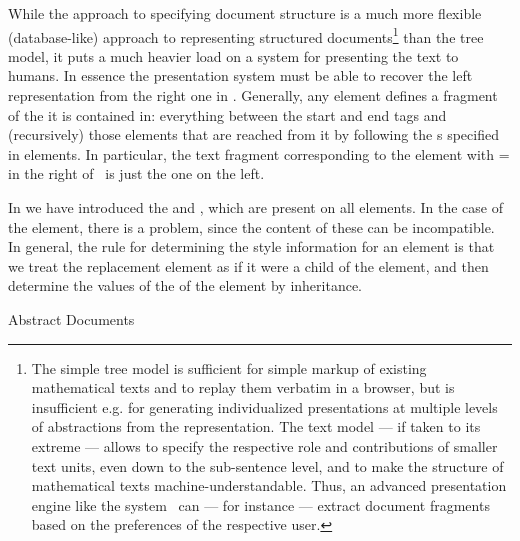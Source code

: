 \begin{omgroup}[id=omdoc-infrastructure,short=Document Infrastructure]
\begin{module}[id=sharing]
\begin{omgroup}[id=sharing,short=Sharing Document Parts]
While the {\omdoc} approach to specifying document structure is a much more flexible
(database-like) approach to representing structured documents\footnote{The simple tree
  model is sufficient for simple markup of existing mathematical texts and to replay them
  verbatim in a browser, but is insufficient e.g. for generating individualized
  presentations at multiple levels of abstractions from the representation. The {\omdoc}
  text model --- if taken to its extreme --- allows to specify the respective role and
  contributions of smaller text units, even down to the sub-sentence level, and to make
  the structure of mathematical texts machine-understandable. Thus, an advanced
  presentation engine like the {\activemath} system~\cite{SieBen:acgap00} can --- for
  instance --- extract document fragments based on the preferences of the respective
  user.}  than the tree model, it puts a much heavier load on a system for presenting the
text to humans. In essence the presentation system must be able to recover the left
representation from the right one in {}.  Generally, any {\omdoc}
element defines a fragment of the {\omdoc} it is contained in: everything between the
start and end tags and (recursively) those elements that are reached from it by following
the {s} specified in {} elements.  In particular,
the text fragment corresponding to the element with
{}={} in the right {\omdoc}
of~ is just the one on the left.

In {} we have introduced the {\css}
 {} and {},
which are present on all {\omdoc} elements. In the case of the {} element,
there is a problem, since the content of these can be incompatible. In general, the rule
for determining the style information for an element is that we treat the replacement
element as if it were a child of the {} element, and then determine the
values of the {\css}  of the {} element by
inheritance.
\end{omgroup}
\end{module}

\begin{module}[id=docalt]
\begin{omgroup}{Abstract Documents}


\end{omgroup}
\end{module}
\end{omgroup}
